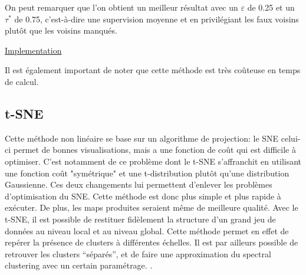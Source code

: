 On peut remarquer que l'on obtient un meilleur résultat avec un $\varepsilon$ de 0.25 et un $\tau^*$ de 0.75, c'est-à-dire une supervision moyenne et en privilégiant les faux voisins plutôt que les voisins manqués.

\href{https://zenodo.org/record/4094851#.YaxeoS_pO-w}{Implementation} 

Il est également important de noter que cette méthode est très coûteuse en temps de calcul. 

\subsection{t-SNE}

Cette méthode non linéaire se base sur un algorithme de projection: le SNE \cite{hinton2002-SNE} celui-ci permet de bonnes visualisations, mais a une fonction de coût qui est difficile à optimiser. C’est notamment de ce problème dont le t-SNE s’affranchit en utilisant une fonction coût "symétrique"  et une t-distribution plutôt qu’une distribution Gaussienne. 
Ces deux changements lui  permettent d’enlever les problèmes d’optimisation du SNE. Cette méthode est donc plus simple et plus rapide à exécuter. De plus, les maps produites seraient même de meilleure qualité\cite{van2008TSNE}.
\smallskip
Avec le t-SNE, il est possible de restituer fidèlement la structure d’un grand jeu de données au niveau local et au niveau global. Cette méthode permet en effet de repérer la présence de clusters à différentes échelles. Il est par ailleurs possible de retrouver les clusters “séparés”, et de faire une approximation du spectral clustering avec un certain paramétrage. \cite{linderman2019Spectral1} \cite{chui2006Spectral2} \cite{von2007SpectralClustering}.
\smallskip

